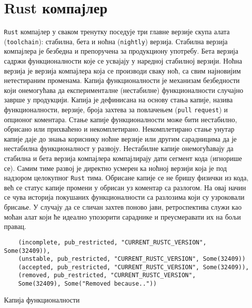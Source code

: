 \section{Rust компајлер}

\verb|Rust| компајлер у сваком тренутку поседује три главне верзије скупа алата (\verb|toolchain|): стабилна, бета и ноћна (\verb|nightly|) верзија.
Стабилна верзија компајлера је безбедна и препоручена за продукциону употребу. Бета верзија садржи функционалности
које се усвајају у наредној стабилној верзији. Ноћна верзија је верзија компајлера која се 
производи сваку ноћ, са свим најновијим нетестираним променама. Капија функционалности је механизам безбедности
који онемогућава да експерименталне (нестабилне) функционалности случајно заврше у продукцији. 
Капија је дефинисана на основу стања капије, назива функционалности, верзије, броја захтева за повлачењем
(\verb|pull| \verb|request|) и опционог коментара.
Стање капије функционалности може бити нестабилно, обрисано или прихваћено и некомплетирано. Некомплетирано 
стање унутар капије даје до знања кориснику ноћне верзије или другим сарадницима да је нестабилна функционалност 
у развоју.  Нестабилне капије онемогућавају да стабилна и бета верзија компајлера компајлирају 
дати сегмент кода (игнорише се).  Самим тиме развој је директно 
усмерен ка ноћној верзији која је под надзором целокупног \verb|Rust| тима. Обрисане капије се не бришу физички из кода,
већ се статус капије промени у обрисан уз коментар са разлогом. На овај начин се чува историја покушаних 
функционалности са разлозима који су узроковали брисање. У случају да се сличан захтев поново јави, ретроспектива
служи као моћан алат који ће идеално упозорити сараднике и преусмеравати их на бољи правац.

\begin{listing}[H]
\begin{verbatim}
    (incomplete, pub_restricted, "CURRENT_RUSTC_VERSION", Some(32409)),
    (unstable, pub_restricted, "CURRENT_RUSTC_VERSION", Some(32409))
    (accepted, pub_restricted, "CURRENT_RUSTC_VERSION", Some(32409)),
    (removed, pub_restricted, "CURRENT_RUSTC_VERSION", 
    Some(32409), Some("Removed because.."))
\end{verbatim}
\caption{Капија функционалности}
\label{lst:rustup_gate}
\end{listing}

